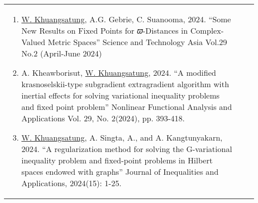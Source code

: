 {\begin{center}
\begin{longtable}{|p{}|p{}|p{}|}
\begin{enumerate}[series=note]
	\item \underline{W. Khuangsatung}, A.G. Gebrie, C. Suanooma,  2024. “Some New Results on Fixed Points for 𝜛-Distances in Complex-Valued Metric Spaces” Science and Technology Asia Vol.29 No.2 (April-June 2024) 
	\item A. Kheawborisut, \underline{W. Khuangsatung}, 2024. “A modified krasnoselskii-type subgradient extragradient algorithm with inertial effects for solving variational inequality problems and fixed point problem” Nonlinear Functional Analysis and Applications Vol. 29, No. 2(2024), pp. 393-418.
	\item \underline{W. Khuangsatung}, A. Singta, A., and A. Kangtunyakarn, 2024. “A regularization method for solving the G-variational inequality problem and fixed-point problems in Hilbert spaces endowed with graphs” Journal of Inequalities and Applications, 2024(15): 1-25. 

\end{enumerate}
\end{longtable}
\end{center}}
